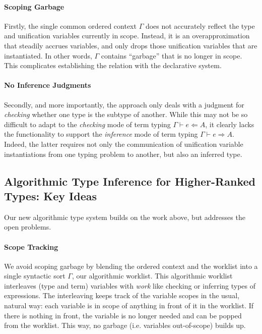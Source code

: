 \paragraph{Scoping Garbage} Firstly, the single common ordered context 
$\Gamma$ does not accurately reflect the type and unification variables
currently in scope. Instead, it is an overapproximation that steadily accrues
variables, and only drops those unification variables that are instantiated.
In other words, $\Gamma$ contains ``garbage'' that is no longer in scope.
This complicates establishing the relation with the declarative system.


\paragraph{No Inference Judgments} 
Secondly, and more importantly, the approach only deals with a judgment for
\emph{checking} whether one type is the subtype of another. While this may not
be so difficult to adapt to the \emph{checking} mode of term typing $\Gamma
\vdash e \Leftarrow A$, it clearly lacks the functionality to support the
\emph{inference} mode of term typing $\Gamma \vdash e \Rightarrow A$. Indeed,
the latter requires not only the communication of unification variable
instantiations from one typing problem to another, but also an inferred type.

\subsection{Algorithmic Type Inference for Higher-Ranked Types: Key Ideas}

Our new algorithmic type system builds on the work above, but
addresses the open problems.

\paragraph{Scope Tracking}
We avoid scoping garbage by blending the ordered context and the
worklist into a single syntactic sort $\Gamma$, our algorithmic worklist. This
algorithmic worklist interleaves (type and term) variables with \emph{work}
like checking or inferring types of expressions. The interleaving keeps track
of the variable scopes in the usual, natural way: each variable is in scope of
anything in front of it in the worklist. If there is nothing in front, the
variable is no longer needed and can be popped from the worklist. This way, no
garbage (i.e. variables out-of-scope) builds up.

